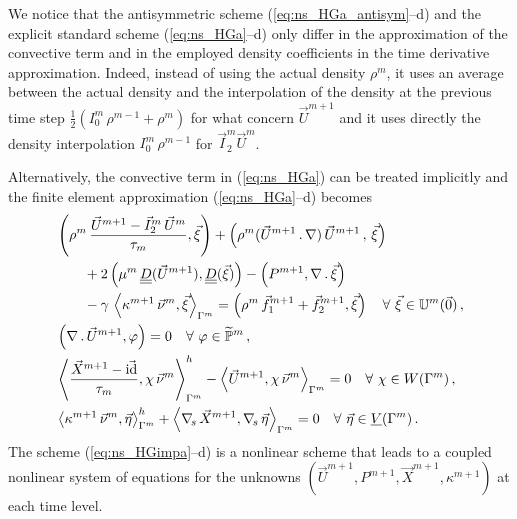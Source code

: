 We notice that the antisymmetric scheme (\ref{eq:ns_HGa_antisym}--d) and
the explicit standard scheme (\ref{eq:ns_HGa}--d)
only differ in the approximation of the convective term and
in the employed density coefficients in the time derivative approximation.
Indeed, instead of using the actual density $\rho^m$, it uses an
average between the actual density and the interpolation of the density at the
previous time step $\tfrac{1}{2}(I^m_0\,\rho^{m-1} + \rho^m)$ for what
concern $\vec U^{m+1}$ and it uses directly the density interpolation
$I^m_0\,\rho^{m-1}$ for $\vec I^m_2\vec U^m$.

Alternatively, the convective term in (\ref{eq:ns_HGa}) can be treated
implicitly and the finite element approximation (\ref{eq:ns_HGa}--d) becomes
\begin{subequations}
\begin{align}
& \left( \rho^m\,\frac{\vec U^{m+1} - \vec I^m_2\,\vec U^m}{\tau_m}, \vec
\xi \right) + \left(\rho^m( \vec U^{m+1}\,.\,\nabla)\,\vec U^{m+1}\,,
\,\vec \xi \right)\nonumber \\
& \qquad + 2\left(\mu^m\,\mat D(\vec U^{m+1}), \mat D(\vec \xi) \right)
- \left(P^{m+1}, \nabla\,.\,\vec \xi\right) \nonumber \\
& \qquad - \gamma\,\left\langle \kappa^{m+1}\,\vec\nu^m ,
\vec\xi\right\rangle_{\Gamma^m}
= \left(\rho^m\,\vec f_1^{m+1}+\vec f_2^{m+1}, \vec \xi\right)
\quad \forall\ \vec\xi \in \uspacedisc{0}{m}\,, \label{eq:ns_HGimpa} \\
& \left(\nabla\,.\,\vec U^{m+1}, \varphi\right)  = 0
\quad \forall\ \varphi \in \pnormspace^m\,,\label{eq:ns_HGimpb} \\
&  \left\langle \frac{\vec X^{m+1} - \vec\id}{\tau_m} ,\chi\,\vec\nu^m
\right\rangle_{\Gamma^m}^h - \left\langle \vec U^{m+1}, \chi\,\vec\nu^m
\right\rangle_{\Gamma^m}  = 0 \quad \forall\ \chi \in \Wh\,,
\label{eq:ns_HGimpc}\\
& \left\langle \kappa^{m+1}\,\vec\nu^m, \vec\eta \right\rangle_{\Gamma^m}^h
+ \left\langle \nabs\,\vec X^{m+1}, \nabs\,\vec \eta \right\rangle_{\Gamma^m} =
0 \quad \forall\ \vec\eta \in \Vh\,. \label{eq:ns_HGimpd}
\end{align}
\end{subequations}
The scheme (\ref{eq:ns_HGimpa}--d) is a nonlinear scheme that leads to a coupled
nonlinear system of equations for the unknowns $(\vec U^{m+1}, P^{m+1}, \vec
X^{m+1}, \kappa^{m+1})$ at each time level.

